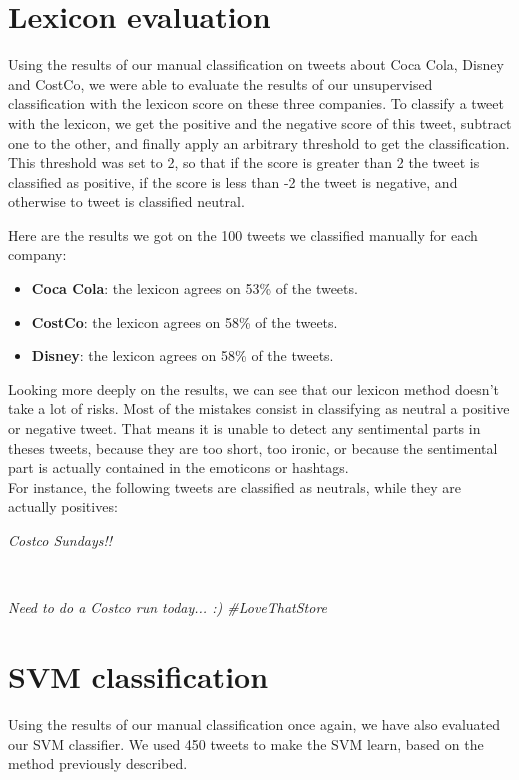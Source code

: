 \documentclass[a4paper,12pt]{report}
\begin{document}
\section{Lexicon evaluation}

Using the results of our manual classification on tweets about Coca Cola, Disney and CostCo, we were able to evaluate the results of our unsupervised classification with the lexicon score on these three companies.
To classify a tweet with the lexicon, we get the positive and the negative score of this tweet, subtract one to the other, and finally apply an arbitrary threshold to get the classification.
This threshold was set to 2, so that if the score is greater than 2 the tweet is classified as positive, if the score is less than -2 the tweet is negative, and otherwise to tweet is classified neutral.

Here are the results we got on the 100 tweets we classified manually for each company:
\begin{itemize}
        \item \textbf{Coca Cola}: the lexicon agrees on 53\% of the tweets.
        \item \textbf{CostCo}: the lexicon agrees on 58\% of the tweets.
        \item \textbf{Disney}: the lexicon agrees on 58\% of the tweets.
\end{itemize}
Looking more deeply on the results, we can see that our lexicon method doesn't take a lot of risks.
Most of the mistakes consist in classifying as neutral a positive or negative tweet. That means it is unable to detect any sentimental parts in theses tweets, because they are too short, too ironic, or because the sentimental part is actually contained in the emoticons or hashtags.\\
For instance, the following tweets are classified as neutrals, while they are actually positives:\\
\centerline{\textit{Costco Sundays!!}}\\
\centerline{\textit{Need to do a Costco run today... :) \#LoveThatStore}}

\section{SVM classification}

Using the results  of our manual classification once again, we have also evaluated our SVM classifier.
We used 450 tweets to make the SVM learn, based on the method previously described.
\end{document}
